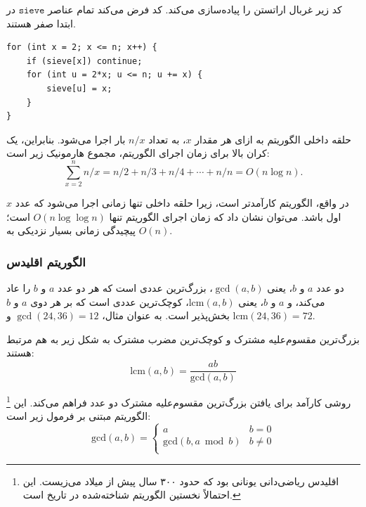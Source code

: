 کد زیر غربال اراتستن را پیاده‌سازی می‌کند.
کد فرض می‌کند تمام عناصر $\texttt{sieve}$ در ابتدا صفر هستند.

\begin{lstlisting}
for (int x = 2; x <= n; x++) {
    if (sieve[x]) continue;
    for (int u = 2*x; u <= n; u += x) {
        sieve[u] = x;
    }
}
\end{lstlisting}

حلقه داخلی الگوریتم به ازای هر مقدار $x$،
به تعداد $n/x$ بار اجرا می‌شود.
بنابراین، یک کران بالا برای زمان اجرای
الگوریتم، مجموع هارمونیک زیر است:
\[\sum_{x=2}^n n/x = n/2 + n/3 + n/4 + \cdots + n/n = O(n \log n).\]


در واقع، الگوریتم کارآمدتر است،
زیرا حلقه داخلی تنها زمانی اجرا می‌شود که
عدد $x$ اول باشد.
می‌توان نشان داد که زمان اجرای
الگوریتم تنها $O(n \log \log n)$ است؛
پیچیدگی زمانی بسیار نزدیکی به $O(n)$.

\subsubsection{الگوریتم اقلیدس}


دو عدد $a$ و $b$، یعنی $\gcd(a,b)$،
بزرگ‌ترین عددی است که هر دو عدد $a$ و $b$ را عاد می‌کند،
و 
$a$ و $b$، یعنی $\textrm{lcm}(a,b)$،
کوچک‌ترین عددی است که بر
هر دوی $a$ و $b$ بخش‌پذیر است.
به عنوان مثال،
$\gcd(24,36)=12$ و
$\textrm{lcm}(24,36)=72$.

بزرگ‌ترین مقسوم‌علیه مشترک و کوچک‌ترین مضرب مشترک
به شکل زیر به هم مرتبط هستند:
\[\textrm{lcm}(a,b)=\frac{ab}{\textrm{gcd}(a,b)}\]

\footnote{اقلیدس ریاضی‌دانی یونانی بود که
حدود ۳۰۰ سال پیش از میلاد می‌زیست. این احتمالاً نخستین الگوریتم شناخته‌شده در تاریخ است.} روشی کارآمد برای
یافتن بزرگ‌ترین مقسوم‌علیه مشترک دو عدد فراهم می‌کند.
این الگوریتم مبتنی بر فرمول زیر است:
\begin{equation*}
    \textrm{gcd}(a,b) = \begin{cases}
               a        & b = 0\\
               \textrm{gcd}(b,a \bmod b) & b \neq 0\\
           \end{cases}
\end{equation*}

